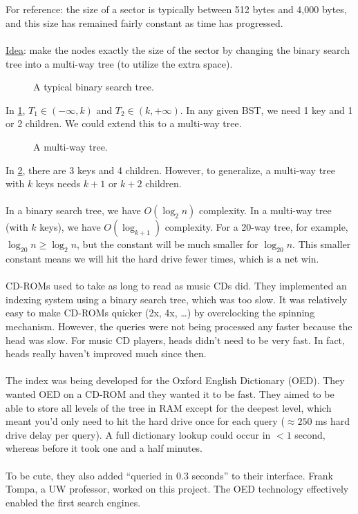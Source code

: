 \documentclass[]{article}
\theoremstyle{definition}
\begin{document}
			\\ \\
			For reference: the size of a sector is typically between 512 bytes and 4,000 bytes, and this size has remained fairly constant as time has progressed.
			\\ \\
			\underline{Idea}: make the nodes exactly the size of the sector by changing the binary search tree into a multi-way tree (to utilize the extra space).
			\begin{figure}[H]
				\caption{A typical binary search tree. \label{figure:typicalbst}}
			\end{figure}

			In \ref{figure:typicalbst}, $T_1 \in (- \infty, k)$ and $T_2 \in (k, +\infty)$. In any given BST, we need 1 key and 1 or 2 children. We could extend this to a multi-way tree.
			\begin{figure}[H]
				\caption{A multi-way tree. \label{figure:typicalmultiwaytree}}
			\end{figure}

			In \ref{figure:typicalmultiwaytree}, there are 3 keys and 4 children. However, to generalize, a multi-way tree with $k$ keys needs $k + 1$ or $k + 2$ children.
			\\ \\
			In a binary search tree, we have $O(\log_2 n)$ complexity. In a multi-way tree (with $k$ keys), we have $O(\log_{k + 1})$ complexity. For a 20-way tree, for example, $\log_{20} n \ge \log_2 n$, but the constant will be much smaller for $\log_{20} n$. This smaller constant means we will hit the hard drive fewer times, which is a net win.
			\\ \\
			CD-ROMs used to take as long to read as music CDs did. They implemented an indexing system using a binary search tree, which was too slow. It was relatively easy to make CD-ROMs quicker (2x, 4x, \ldots) by overclocking the spinning mechanism. However, the queries were not being processed any faster because the head was slow. For music CD players, heads didn't need to be very fast. In fact, heads really haven't improved much since then.
			\\ \\
			The index was being developed for the Oxford English Dictionary (OED). They wanted OED on a CD-ROM and they wanted it to be fast. They aimed to be able to store all levels of the tree in RAM except for the deepest level, which meant you'd only need to hit the hard drive once for each query ($\approx 250$ ms hard drive delay per query). A full dictionary lookup could occur in $< 1$ second, whereas before it took one and a half minutes.
			\\ \\
			To be cute, they also added ``queried in 0.3 seconds'' to their interface. Frank Tompa, a UW professor, worked on this project. The OED technology effectively enabled the first search engines.
\end{document}
